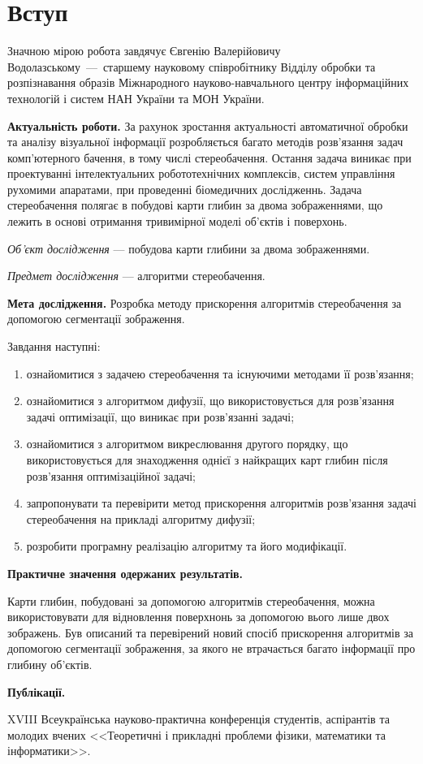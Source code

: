 \chapter*{Вступ}

Значною мірою робота завдячує Євгенію Валерійовичу Водолазському~---~старшему
науковому співробітнику Відділу обробки та розпізнавання образів
Міжнародного науково-навчального центру інформаційних технологій
і систем НАН України та МОН України.

\textbf{Актуальність роботи.}
За рахунок зростання актуальності автоматичної обробки
та аналізу візуальної інформації розробляється багато методів
розв'язання задач комп'ютерного бачення, в тому числі стереобачення.
Остання задача виникає при проектуванні інтелектуальних робототехнічних
комплексів, систем управління рухомими апаратами,
при проведенні біомедичних дослідженнь.
Задача стереобачення полягає в побудові карти глибин за двома зображеннями,
що лежить в основі отримання тривимірної моделі об'єктів і поверхонь.

\textit{Об'єкт дослідження} ---
побудова карти глибини за двома зображеннями.

\textit{Предмет дослідження} ---
алгоритми стереобачення.

\textbf{Мета дослідження.}
Розробка методу прискорення алгоритмів стереобачення
за допомогою сегментації зображення.

Завдання наступні:
\begin{enumerate}
  \item
    ознайомитися з задачею стереобачення та існуючими методами її розв'язання;
  \item
    ознайомитися з алгоритмом дифузії,
    що використовується для розв'язання задачі оптимізації,
    що виникає при розв'язанні задачі;
  \item
    ознайомитися з алгоритмом викреслювання другого порядку,
    що використовується для знаходження однієї з найкращих карт глибин
    після розв'язання оптимізаційної задачі;
  \item
    запропонувати та перевірити метод прискорення
    алгоритмів розв'язання задачі стереобачення на прикладі алгоритму дифузії;
  \item
    розробити програмну реалізацію алгоритму та його модифікації.
\end{enumerate}

\textbf{Практичне значення одержаних результатів.}

Карти глибин, побудовані за допомогою алгоритмів стереобачення,
можна використовувати для відновлення поверхнонь за допомогою вього
лише двох зображень.
Був описаний та перевірений
новий спосіб прискорення алгоритмів за допомогою сегментації зображення,
за якого не втрачається багато інформації про глибину об'єктів.

\textbf{Публікації.}

XVIII Всеукраїнська науково-практична конференція студентів,
аспірантів та молодих вчених <<Теоретичні і прикладні проблеми фізики,
математики та інформатики>>.
